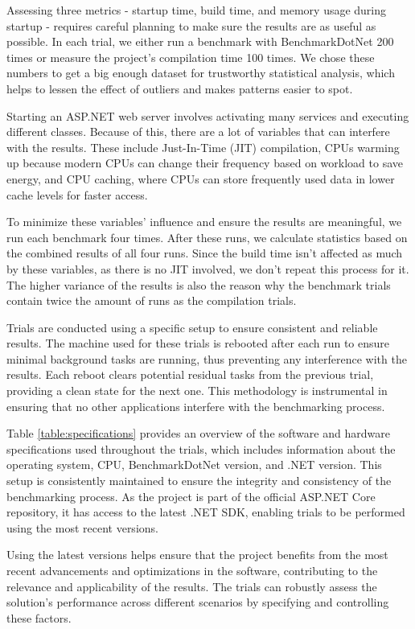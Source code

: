 Assessing three metrics - startup time, build time, and memory usage during startup - requires careful planning to make sure the results are as useful as possible. In each trial, we either run a benchmark with BenchmarkDotNet 200 times or measure the project's compilation time 100 times. We chose these numbers to get a big enough dataset for trustworthy statistical analysis, which helps to lessen the effect of outliers and makes patterns easier to spot.

Starting an ASP.NET web server involves activating many services and executing different classes. Because of this, there are a lot of variables that can interfere with the results. These include Just-In-Time (JIT) compilation, CPUs warming up because modern CPUs can change their frequency based on workload to save energy, and CPU caching, where CPUs can store frequently used data in lower cache levels for faster access.

To minimize these variables' influence and ensure the results are meaningful, we run each benchmark four times. After these runs, we calculate statistics based on the combined results of all four runs. Since the build time isn't affected as much by these variables, as there is no JIT involved, we don't repeat this process for it. The higher variance of the results is also the reason why the benchmark trials contain twice the amount of runs as the compilation trials.

Trials are conducted using a specific setup to ensure consistent and reliable results. The machine used for these trials is rebooted after each run to ensure minimal background tasks are running, thus preventing any interference with the results. Each reboot clears potential residual tasks from the previous trial, providing a clean state for the next one. This methodology is instrumental in ensuring that no other applications interfere with the benchmarking process.

Table \ref{table:specifications} provides an overview of the software and hardware specifications used throughout the trials, which includes information about the operating system, CPU, BenchmarkDotNet version, and .NET version. This setup is consistently maintained to ensure the integrity and consistency of the benchmarking process. As the project is part of the official ASP.NET Core repository, it has access to the latest .NET SDK, enabling trials to be performed using the most recent versions.

Using the latest versions helps ensure that the project benefits from the most recent advancements and optimizations in the software, contributing to the relevance and applicability of the results. The trials can robustly assess the solution's performance across different scenarios by specifying and controlling these factors.

